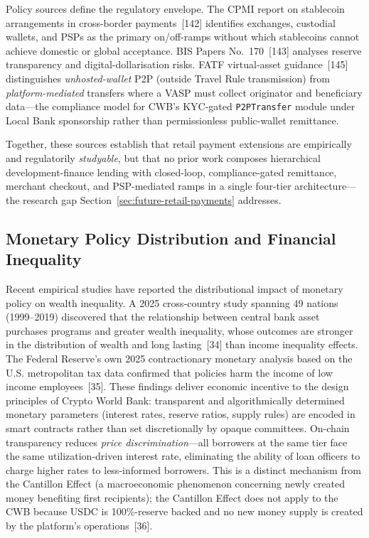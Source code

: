 \documentclass[12pt,a4paper]{report}
\begin{document}
Policy sources define the regulatory envelope. The CPMI report on stablecoin arrangements in cross-border payments~[142] identifies exchanges, custodial wallets, and PSPs as the primary on/off-ramps without which stablecoins cannot achieve domestic or global acceptance. BIS Papers No.~170~[143] analyses reserve transparency and digital-dollarisation risks. FATF virtual-asset guidance~[145] distinguishes \emph{unhosted-wallet} P2P (outside Travel Rule transmission) from \emph{platform-mediated} transfers where a VASP must collect originator and beneficiary data---the compliance model for CWB's KYC-gated \texttt{P2PTransfer} module under Local Bank sponsorship rather than permissionless public-wallet remittance.

Together, these sources establish that retail payment extensions are empirically and regulatorily \emph{studyable}, but that no prior work composes hierarchical development-finance lending with closed-loop, compliance-gated remittance, merchant checkout, and PSP-mediated ramps in a single four-tier architecture---the research gap Section~\ref{sec:future-retail-payments} addresses.

\subsection{Monetary Policy Distribution and Financial Inequality}

Recent empirical studies have reported the distributional impact of monetary policy on wealth inequality. A 2025 cross-country study spanning 49 nations (1999--2019) discovered that the relationship between central bank asset purchases programs and greater wealth inequality, whose outcomes are stronger in the distribution of wealth and long lasting~[34] than income inequality effects. The Federal Reserve's own 2025 contractionary monetary analysis based on the U.S. metropolitan tax data confirmed that policies harm the income of low income employees~[35]. These findings deliver economic incentive to the design principles of Crypto World Bank: transparent and algorithmically determined monetary parameters (interest rates, reserve ratios, supply rules) are encoded in smart contracts rather than set discretionally by opaque committees. On-chain transparency reduces \textit{price discrimination}---all borrowers at the same tier face the same utilization-driven interest rate, eliminating the ability of loan officers to charge higher rates to less-informed borrowers. This is a distinct mechanism from the Cantillon Effect (a macroeconomic phenomenon concerning newly created money benefiting first recipients); the Cantillon Effect does not apply to the CWB because USDC is 100\%-reserve backed and no new money supply is created by the platform's operations~[36].
\end{document}
